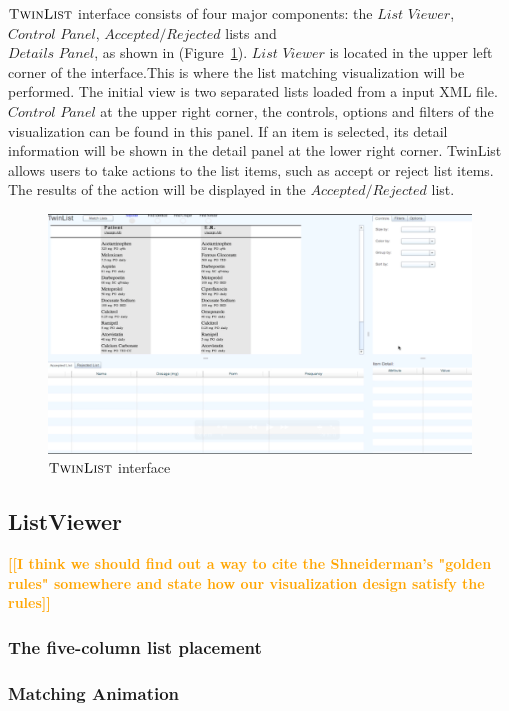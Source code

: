 \documentclass{chi2009}
\newcommand{\todo}[1]{\textsf{\textbf{\textcolor{Orange}{[[#1]]}}}}
\newcommand{\TwinList}{\textsc{TwinList}}
\newcommand{\ListViewer}{\textit{List Viewer}}
\newcommand{\AcceptedRejected}{\textit{Accepted/Rejected}}
\newcommand{\Controls}{\textit{Control Panel}}
\newcommand{\Details}{\textit{Details Panel}}
\begin{document}
$\TwinList$ interface consists of four major components: the $\ListViewer$, $\Controls$, $\AcceptedRejected$ lists and\\ $\Details$, as shown in (Figure~\ref{fig:interface}). $\ListViewer$ is located in the upper left corner of the interface.This is where the list matching visualization will be performed. The initial view is two separated lists loaded from a input XML file.  $\Controls$ at the upper right corner, the controls, options and filters of the visualization can be found in this panel. If an item is selected, its detail information will be shown in the detail panel at the lower right corner. TwinList allows users to take actions to the list items, such as accept or reject list items. The results of the action will be displayed in the $\AcceptedRejected$ list. 


\begin{figure}
\begin{center}
\includegraphics[width=1.1\linewidth]{interface}
\end{center}
   \caption{$\TwinList$ interface}
   \label{fig:interface}
\end{figure}

\subsection{ListViewer}
 \todo{I think we should find out a way to cite the Shneiderman's "golden rules" somewhere and state how our visualization design satisfy the rules}
\subsubsection{The five-column list placement}
\subsubsection{Matching Animation}
\end{document}
